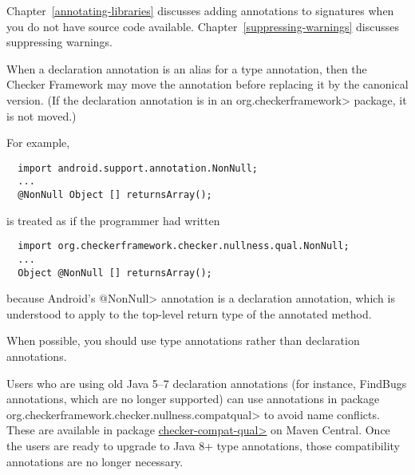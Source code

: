 Chapter~\ref{annotating-libraries} discusses adding annotations to
signatures when you do not have source code available.
Chapter~\ref{suppressing-warnings} discusses suppressing warnings.


When a declaration annotation is an alias for a type annotation, then the
Checker Framework may move the annotation before replacing it by the
canonical version. (If the declaration annotation is in an \<org.checkerframework>
package, it is not moved.)

For example,

\begin{Verbatim}
  import android.support.annotation.NonNull;
  ...
  @NonNull Object [] returnsArray();
\end{Verbatim}

\noindent
is treated as if the programmer had written

\begin{Verbatim}
  import org.checkerframework.checker.nullness.qual.NonNull;
  ...
  Object @NonNull [] returnsArray();
\end{Verbatim}

\noindent
because Android's \<@NonNull> annotation is a declaration annotation, which
is understood to apply to the top-level return type of the annotated method.

When possible, you should use type annotations rather than declaration
annotations.

Users who are using old Java 5--7 declaration annotations (for instance,
FindBugs annotations, which are no longer supported) can use annotations in
package \<org.checkerframework.checker.nullness.compatqual> to avoid name
conflicts.  These are available in package
\href{https://search.maven.org/search?q=a:checker-compat-qual}{\<checker-compat-qual>}
on Maven Central.  Once the users are ready to upgrade to Java 8+ type
annotations, those compatibility annotations are no longer necessary.


